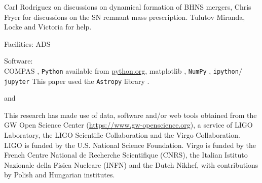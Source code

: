 \documentclass[twocolumn]{aastex63}
\newcommand\bhnsSingle{BHNS\xspace}
\begin{document}
Carl Rodriguez on discussions on dynamical formation of \bhnsSingle mergers, Chris Fryer for discussions on the  \ac{SN} remnant mass prescription. Tulutov
Miranda, Locke and Victoria for help.

Facilities: ADS

Software: \\
\textsc{COMPAS}  \citep{stevenson2017formation, 2018MNRAS.477.4685B, 2018MNRAS.481.4009V},   \texttt{Python} available from \url{python.org}, matplotlib \citep{2007CSE.....9...90H},  \texttt{NumPy} \citep{2011CSE....13b..22V}, \texttt{ipython$/$jupyter} \citep{2007CSE.....9c..21P, kluyver2016jupyter} This paper used the \texttt{Astropy} library \citep{2018AJ....156..123A}.

 {} and  {}

%


This research has made use of data, software and/or web tools obtained from the \ac{GW} Open Science Center (\url{https://www.gw-openscience.org}), a service of LIGO Laboratory, the LIGO Scientific Collaboration and the Virgo Collaboration. LIGO is funded by the U.S. National Science Foundation. Virgo is funded by the French Centre National de Recherche Scientifique (CNRS), the Italian Istituto Nazionale della Fisica Nucleare (INFN) and the Dutch Nikhef, with contributions by Polish and Hungarian institutes.
%
%




{}








\end{document}
